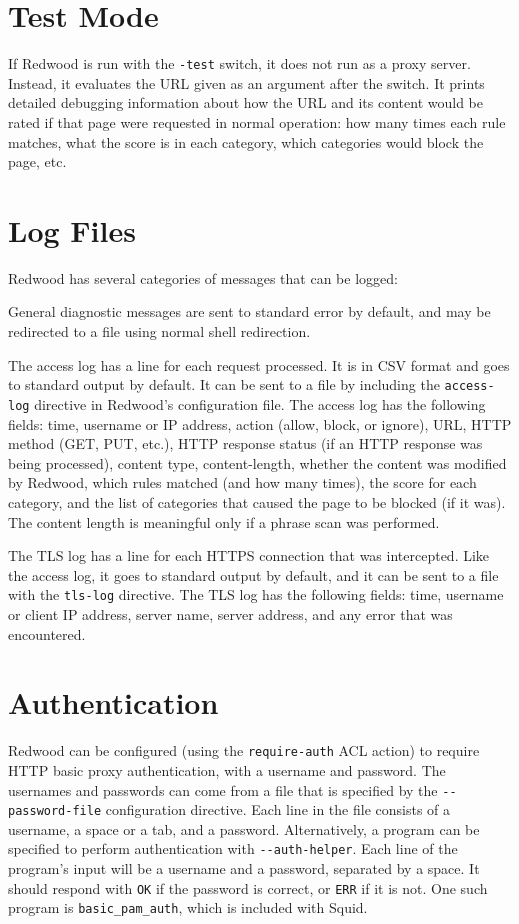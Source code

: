 \documentclass{article}
\begin{document}
\section{Test Mode}

If Redwood is run with the \verb"-test" switch, it does not run as a proxy server. 
Instead, it evaluates the URL given as an argument after the switch.
It prints detailed debugging information about how the URL and its content would be rated
if that page were requested in normal operation: how many times each rule matches, 
what the score is in each category, which categories would block the page, etc.

\section{Log Files}

Redwood has several categories of messages that can be logged:

General diagnostic messages are sent to standard error by default,
and may be redirected to a file using normal shell redirection.

The access log has a line for each request processed.
It is in CSV format
and goes to standard output by default.
It can be sent to a file by including the \verb"access-log" directive in Redwood's configuration file.
The access log has the following fields: time, username or IP address, 
action (allow, block, or ignore), URL, HTTP method (GET, PUT, etc.),
HTTP response status (if an HTTP response was being processed), 
content type, content-length, whether the content was modified by Redwood, which rules matched (and how many times), 
the score for each category, and the list of categories that caused the page to be blocked (if it was).
The content length is meaningful only if a phrase scan was performed.

The TLS log has a line for each HTTPS connection that was intercepted.
Like the access log, it goes to standard output by default, 
and it can be sent to a file with the \verb"tls-log" directive.
The TLS log has the following fields:
time, username or client IP address, server name, server address, 
and any error that was encountered.

\section{Authentication}

Redwood can be configured (using the \verb"require-auth" ACL action) to require HTTP basic proxy authentication,
with a username and password.
The usernames and passwords can come from a file that is specified by the \verb"--password-file"
configuration directive. Each line in the file consists of a username,
a space or a tab, and a password.
Alternatively, a program can be specified to perform authentication with \verb"--auth-helper".
Each line of the program's input will be a username and a password, separated by a space.
It should respond with \verb"OK" if the password is correct, or \verb"ERR" if it is not.
One such program is \verb"basic_pam_auth", which is included with Squid.
\end{document}
